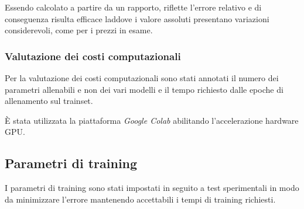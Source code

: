 Essendo calcolato a partire da un rapporto, riflette l'errore relativo e di
conseguenza risulta efficace laddove i valore assoluti presentano variazioni
considerevoli, come per i prezzi in esame.


\subsubsection{Valutazione dei costi computazionali}

Per la valutazione dei costi computazionali sono stati annotati il numero dei
parametri allenabili e non dei vari modelli e il tempo richiesto dalle epoche di
allenamento sul trainset.

È stata utilizzata la piattaforma \textit{Google Colab} abilitando l'accelerazione hardware GPU.

\subsection{Parametri di training}

I parametri di training sono stati impostati in seguito a test sperimentali in
modo da minimizzare l'errore mantenendo accettabili i tempi di training richiesti.
